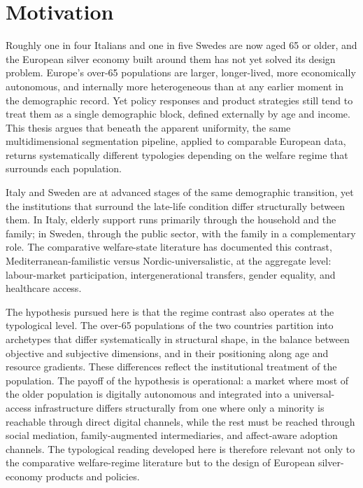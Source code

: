 \label{ch:ch1}

\section{Motivation}
\label{sec:ch1-motivation}

Roughly one in four Italians \citep{istat2024} and one in five Swedes \citep{scb2024} are now aged 65 or older, and the European silver economy built around them has not yet solved its design problem. Europe's over-65 populations are larger, longer-lived, more economically autonomous, and internally more heterogeneous than at any earlier moment in the demographic record. Yet policy responses and product strategies still tend to treat them as a single demographic block, defined externally by age and income. This thesis argues that beneath the apparent uniformity, the same multidimensional segmentation pipeline, applied to comparable European data, returns systematically different typologies depending on the welfare regime that surrounds each population.

Italy and Sweden are at advanced stages of the same demographic transition, yet the institutions that surround the late-life condition differ structurally between them. In Italy, elderly support runs primarily through the household and the family; in Sweden, through the public sector, with the family in a complementary role. The comparative welfare-state literature has documented this contrast, Mediterranean-familistic versus Nordic-universalistic, at the aggregate level: labour-market participation, intergenerational transfers, gender equality, and healthcare access.

The hypothesis pursued here is that the regime contrast also operates at the typological level. The over-65 populations of the two countries partition into archetypes that differ systematically in structural shape, in the balance between objective and subjective dimensions, and in their positioning along age and resource gradients. These differences reflect the institutional treatment of the population. The payoff of the hypothesis is operational: a market where most of the older population is digitally autonomous and integrated into a universal-access infrastructure differs structurally from one where only a minority is reachable through direct digital channels, while the rest must be reached through social mediation, family-augmented intermediaries, and affect-aware adoption channels. The typological reading developed here is therefore relevant not only to the comparative welfare-regime literature but to the design of European silver-economy products and policies.

